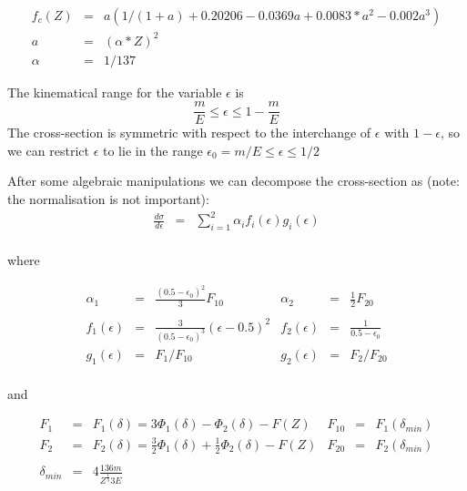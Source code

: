 \[ \begin{array}{LCL}
f_c(Z) & = & a(1/(1+a)+0.20206-0.0369a+0.0083*a^2-0.002a^3)\\
    a   & = & (\alpha*Z)^2                                     \\
\alpha  & = & 1/137
\end{array} \]

The kinematical range for the variable $\epsilon$ is
\begin{equation}
\frac {m}{E} \leq \epsilon  \leq 1 - \frac{m}{E}
\end{equation}
The cross-section is symmetric with respect to
the interchange of $\epsilon$ with
$1-\epsilon $, so we can restrict $\epsilon $ to lie in the range
 $\epsilon_0  = m/E\leq \epsilon \leq 1/2 $

After some algebraic manipulations we can decompose the cross-section
as (note: the normalisation is not important):
\[ \begin{array}{LCLLCL}
\frac{d\sigma}{d\epsilon} & = &
\sum^{2}_{i=1}\alpha_i f_i (\epsilon) g_i (\epsilon) \\
\end{array} \]

where

\[ \begin{array}{LCLLCL}
\alpha_1 & = & \frac{(0.5 - \epsilon_0)^2}{3} F_{10} &
\alpha_2 & = & \frac{1}{2}F_{20}    \\
\\
f_1 (\epsilon)& =&
\frac{ 3}{ (0.5 - \epsilon_0)^3}(\epsilon-0.5)^2  &
f_2 (\epsilon)& =& \frac{ 1}{ 0.5-\epsilon_0}    \\
g_1 (\epsilon)&     =&  F_1 / F_{10}      &
g_2 (\epsilon)&  = & F_2 / F_{20}        \\
\end{array} \]

and

\[ \begin{array}{LCLLCL}
F_1   &   = & F_1(\delta) = 3\Phi_1(\delta)-\Phi_2(\delta)-F(Z)       &
F_{10}  & = & F_1(\delta_{min})                                          \\
F_2  &  = & F_2(\delta) = \frac{3}{2}\Phi_1(\delta)+
                        \frac{1}{2}\Phi_2(\delta)-F(Z)            &
F_{20}  & = & F_2(\delta_{min})                                          \\
\\
\delta_{min} & = & 4\frac{ 136m}{ Z^{\frac{1}{3}}3E} & \\
\end{array} \]


